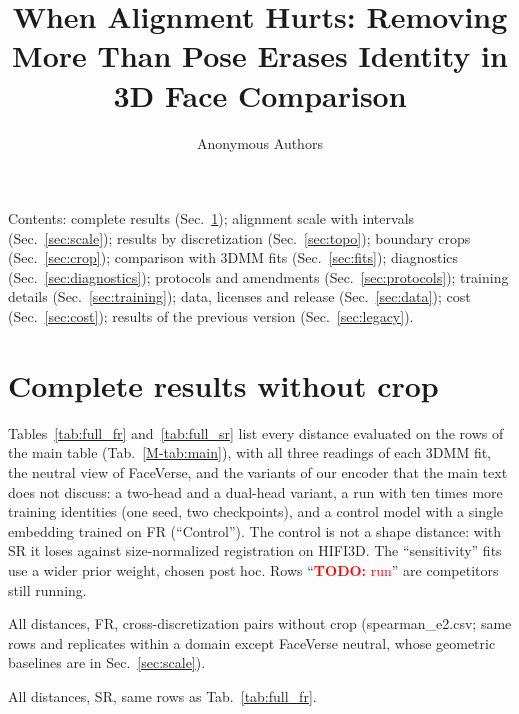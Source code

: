 \documentclass[10pt,twocolumn,letterpaper]{article}
\title{When Alignment Hurts: Removing More Than Pose Erases Identity in 3D Face Comparison}
\author{Anonymous Authors}
\newcommand{\todo}[1]{\textcolor{red}{\textbf{TODO:} #1}}
\begin{document}
\maketitlesupplementary

\noindent Contents: complete results (Sec.~\ref{sec:tables}); alignment scale with intervals (Sec.~\ref{sec:scale}); results by discretization (Sec.~\ref{sec:topo}); boundary crops (Sec.~\ref{sec:crop}); comparison with 3DMM fits (Sec.~\ref{sec:fits}); diagnostics (Sec.~\ref{sec:diagnostics}); protocols and amendments (Sec.~\ref{sec:protocols}); training details (Sec.~\ref{sec:training}); data, licenses and release (Sec.~\ref{sec:data}); cost (Sec.~\ref{sec:cost}); results of the previous version (Sec.~\ref{sec:legacy}).

\section{Complete results without crop}
\label{sec:tables}
Tables~\ref{tab:full_fr} and~\ref{tab:full_sr} list every distance evaluated on the rows of the main table (Tab.~\ref{M-tab:main}), with all three readings of each 3DMM fit, the neutral view of FaceVerse, and the variants of our encoder that the main text does not discuss: a two-head and a dual-head variant, a run with ten times more training identities (one seed, two checkpoints), and a control model with a single embedding trained on FR (``Control''). The control is not a shape distance: with SR it loses against size-normalized registration on HIFI3D. The ``sensitivity'' fits use a wider prior weight, chosen post hoc. Rows ``\todo{run}'' are competitors still running.

\begin{table}[p]
  \centering
  \scriptsize
  \caption{All distances, FR, cross-discretization pairs without crop (spearman\_e2.csv; same rows and replicates within a domain except FaceVerse neutral, whose geometric baselines are in Sec.~\ref{sec:scale}).}
  \label{tab:full_fr}
  \begin{adjustbox}{max width=\textwidth, max totalheight=0.88\textheight}\end{adjustbox}
\end{table}

\begin{table}[p]
  \centering
  \scriptsize
  \caption{All distances, SR, same rows as Tab.~\ref{tab:full_fr}.}
  \label{tab:full_sr}
  \begin{adjustbox}{max width=\textwidth, max totalheight=0.88\textheight}\end{adjustbox}
\end{table}
\end{document}
